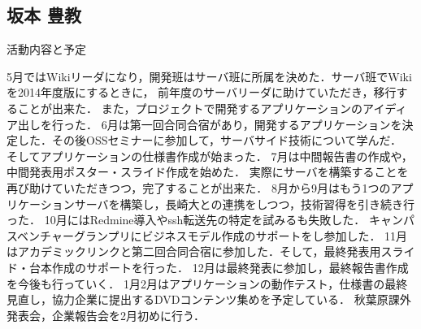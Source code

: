 \subsection{坂本 豊教}
\par
活動内容と予定
\par
  5月ではWikiリーダになり，開発班はサーバ班に所属を決めた．サーバ班でWikiを2014年度版にするときに，
前年度のサーバリーダに助けていただき，移行することが出来た．
また，プロジェクトで開発するアプリケーションのアイディア出しを行った．
6月は第一回合同合宿があり，開発するアプリケーションを決定した．その後OSSセミナーに参加して，サーバサイド技術について学んだ．
そしてアプリケーションの仕様書作成が始まった．
7月は中間報告書の作成や，中間発表用ポスター・スライド作成を始めた．
実際にサーバを構築することを再び助けていただきつつ，完了することが出来た．
8月から9月はもう1つのアプリケーションサーバを構築し，長崎大との連携をしつつ，技術習得を引き続き行った．
10月にはRedmine導入やssh転送先の特定を試みるも失敗した．
キャンパスベンチャーグランプリにビジネスモデル作成のサポートをし参加した．
11月はアカデミックリンクと第二回合同合宿に参加した．そして，最終発表用スライド・台本作成のサポートを行った．
12月は最終発表に参加し，最終報告書作成を今後も行っていく．
1月2月はアプリケーションの動作テスト，仕様書の最終見直し，協力企業に提出するDVDコンテンツ集めを予定している．
秋葉原課外発表会，企業報告会を2月初めに行う．

